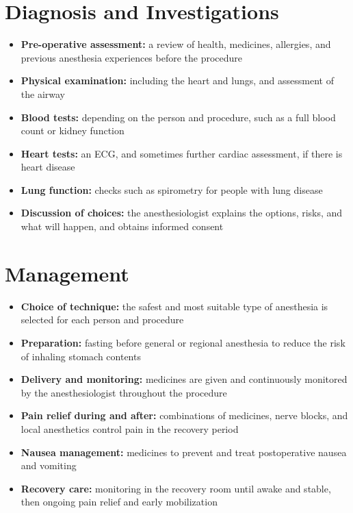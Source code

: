 \section*{Diagnosis and Investigations}
\begin{itemize}
    \item \textbf{Pre-operative assessment:} a review of health, medicines, allergies, and previous anesthesia experiences before the procedure
    \item \textbf{Physical examination:} including the heart and lungs, and assessment of the airway
    \item \textbf{Blood tests:} depending on the person and procedure, such as a full blood count or kidney function
    \item \textbf{Heart tests:} an ECG, and sometimes further cardiac assessment, if there is heart disease
    \item \textbf{Lung function:} checks such as spirometry for people with lung disease
    \item \textbf{Discussion of choices:} the anesthesiologist explains the options, risks, and what will happen, and obtains informed consent
\end{itemize}

\section*{Management}
\begin{itemize}
    \item \textbf{Choice of technique:} the safest and most suitable type of anesthesia is selected for each person and procedure
    \item \textbf{Preparation:} fasting before general or regional anesthesia to reduce the risk of inhaling stomach contents
    \item \textbf{Delivery and monitoring:} medicines are given and continuously monitored by the anesthesiologist throughout the procedure
    \item \textbf{Pain relief during and after:} combinations of medicines, nerve blocks, and local anesthetics control pain in the recovery period
    \item \textbf{Nausea management:} medicines to prevent and treat postoperative nausea and vomiting
    \item \textbf{Recovery care:} monitoring in the recovery room until awake and stable, then ongoing pain relief and early mobilization
\end{itemize}

